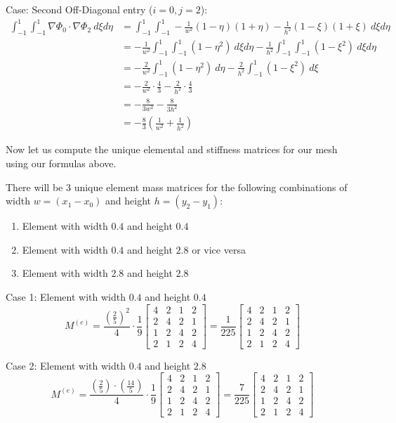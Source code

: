 \documentclass[12pt]{article}
\begin{document}
Case: Second Off-Diagonal entry ($i=0, j=2$):
\begin{align*}
    \int_{-1}^{1} \int_{-1}^{1} \nabla \Phi_0 \cdot \nabla \Phi_2 \ d\xi d\eta &= \int_{-1}^{1} \int_{-1}^{1} -\frac{1}{w^2}(1-\eta)(1+\eta) - \frac{1}{h^2}(1-\xi)(1+\xi) \ d\xi d\eta \\
&= -\frac{1}{w^2} \int_{-1}^1 \int_{-1}^1 (1-\eta^2) \ d\xi d\eta - \frac{1}{h^2} \int_{-1}^1 \int_{-1}^1 (1-\xi^2) \ d\xi d\eta \\
&= -\frac{2}{w^2} \int_{-1}^1 (1-\eta^2) \ d\eta - \frac{2}{h^2}\int_{-1}^1 (1-\xi^2) \ d\xi \\
&= -\frac{2}{w^2} \cdot \frac{4}{3} - \frac{2}{h^2} \cdot \frac{4}{3}\\
&= -\frac{8}{3w^2} - \frac{8}{3h^2}\\
&= -\frac{8}{3} \left(\frac{1}{w^2} + \frac{1}{h^2}\right)
\end{align*}

Now let us compute the unique elemental and stiffness matrices for our mesh using our formulas above.

There will be 3 unique element mass matrices for the following combinations of width $w=(x_1 - x_0)$ and height $h=(y_2 - y_1)$:
\begin{enumerate}
    \item Element with width $0.4$ and height $0.4$
    \item Element with width $0.4$ and height $2.8$ or vice versa
    \item Element with width $2.8$ and height $2.8$
\end{enumerate}

Case 1: Element with width $0.4$ and height $0.4$
\[M^{(e)} = \frac{(\frac{2}{5})^2}{4} \cdot \frac{1}{9}
\begin{bmatrix}
4 & 2 & 1 & 2 \\
2 & 4 & 2 & 1 \\
1 & 2 & 4 & 2 \\
2 & 1 & 2 & 4
\end{bmatrix} = \frac{1}{225}
\begin{bmatrix}
4 & 2 & 1 & 2 \\
2 & 4 & 2 & 1 \\
1 & 2 & 4 & 2 \\
2 & 1 & 2 & 4
\end{bmatrix}\]

Case 2: Element with width $0.4$ and height $2.8$
\[M^{(e)} = \frac{(\frac{2}{5}) \cdot (\frac{14}{5})}{4} \cdot \frac{1}{9}
\begin{bmatrix}
4 & 2 & 1 & 2 \\
2 & 4 & 2 & 1 \\
1 & 2 & 4 & 2 \\
2 & 1 & 2 & 4
\end{bmatrix} = \frac{7}{225}
\begin{bmatrix}
4 & 2 & 1 & 2 \\
2 & 4 & 2 & 1 \\
1 & 2 & 4 & 2 \\
2 & 1 & 2 & 4
\end{bmatrix}\]
\end{document}
